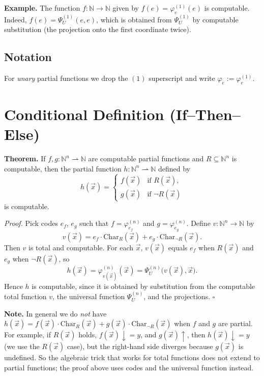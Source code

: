 \documentclass[11pt]{article}
\begin{document}
\textbf{Example.} The function $f\colon \mathbb{N} \to \mathbb{N}$ given by $f(e) = \varphi_e^{(1)}(e)$ is computable. Indeed, $f(e) = \Psi_U^{(1)}(e, e)$, which is obtained from $\Psi_U^{(1)}$ by computable substitution (the projection onto the first coordinate twice).

\subsection{Notation}

For \emph{unary} partial functions we drop the $(1)$ superscript and write $\varphi_e := \varphi_e^{(1)}$.

\section{Conditional Definition (If--Then--Else)}

\textbf{Theorem.} If $f, g\colon \mathbb{N}^n \rightharpoonup \mathbb{N}$ are computable partial functions and $R \subseteq \mathbb{N}^n$ is computable, then the partial function $h\colon \mathbb{N}^n \rightharpoonup \mathbb{N}$ defined by
\[
    h(\vec{x}) = \begin{cases} f(\vec{x}) & \text{if } R(\vec{x}), \\ g(\vec{x}) & \text{if } \neg R(\vec{x}) \end{cases}
\]
is computable.

\textit{Proof.} Pick codes $e_f$, $e_g$ such that $f = \varphi_{e_f}^{(n)}$ and $g = \varphi_{e_g}^{(n)}$. Define $v\colon \mathbb{N}^n \to \mathbb{N}$ by
\[
    v(\vec{x}) = e_f \cdot \mathrm{Char}_R(\vec{x}) + e_g \cdot \mathrm{Char}_{\neg R}(\vec{x}).
\]
Then $v$ is total and computable. For each $\vec{x}$, $v(\vec{x})$ equals $e_f$ when $R(\vec{x})$ and $e_g$ when $\neg R(\vec{x})$, so
\[
    h(\vec{x}) = \varphi_{v(\vec{x})}^{(n)}(\vec{x}) = \Psi_U^{(n)}\bigl(v(\vec{x}), \vec{x}\bigr).
\]
Hence $h$ is computable, since it is obtained by substitution from the computable total function $v$, the universal function $\Psi_U^{(n)}$, and the projections. \hfill$\square$

\textbf{Note.} In general we do \emph{not} have $h(\vec{x}) = f(\vec{x}) \cdot \mathrm{Char}_R(\vec{x}) + g(\vec{x}) \cdot \mathrm{Char}_{\neg R}(\vec{x})$ when $f$ and $g$ are partial. For example, if $R(\vec{x})$ holds, $f(\vec{x}){\downarrow}= y$, and $g(\vec{x}){\uparrow}$, then $h(\vec{x}){\downarrow}= y$ (we use the $R(\vec{x})$ case), but the right-hand side diverges because $g(\vec{x})$ is undefined. So the algebraic trick that works for total functions does not extend to partial functions; the proof above uses codes and the universal function instead.
\end{document}
